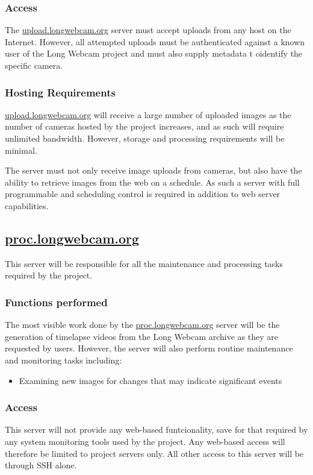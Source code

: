 \documentclass[11pt]{article}
\begin{document}
\subsubsection{Access}

The \url{upload.longwebcam.org} server must accept uploads from any host on the Internet. However, all attempted uploads must be authenticated against a known user of the Long Webcam project and must also supply metadata t oidentify the specific camera.

\subsubsection{Hosting Requirements}
\url{upload.longwebcam.org} will receive a large number of uploaded images as the number of cameras hosted by the project increases, and as such will require unlimited bandwidth. However, storage and processing requirements will be minimal.

The server must not only receive image uploads from cameras, but also have the ability to retrieve images from the web on a schedule. As such a server with full programmable and scheduling control is required in addition to web server capabilities.

\subsection{\protect\url{proc.longwebcam.org}}

This server will be responsible for all the maintenance and processing tasks required by the project.

\subsubsection{Functions performed}
The most visible work done by the \url{proc.longwebcam.org} server will be the generation of timelapse videos from the Long Webcam archive as they are requested by users. However, the server will also perform routine maintenance and monitoring tasks including:

\begin{itemize}
    \item Examining new images for changes that may indicate significant events
\end{itemize}


\subsubsection{Access}
This server will not provide any web-based funtcionality, save for that required by any system monitoring tools used by the project. Any web-based access will therefore be limited to project servers only. All other access to this server will be through SSH alone.
\end{document}
